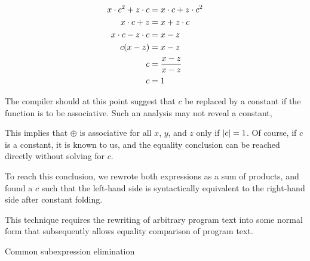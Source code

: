 \begin{align*}
x \cdot c^2 + z \cdot c &= x \cdot c + z \cdot c^2 \\
x \cdot c + z &= x + z \cdot c \\
x \cdot c - z \cdot c &= x - z \\
c (x-z) &= x-z \\
c &= {x-z\over x-z} \\
c &= 1
\end{align*}

The compiler should at this point suggest that $c$ be replaced by a constant if
the function is to be associative. Such an analysis may not reveal a constant, 

This implies that $\oplus$ is associative for all $x$, $y$, and $z$ only if
$\left|{c}\right|=1$. Of course, if $c$ is a constant, it is known to us, and the
equality conclusion can be reached directly without solving for $c$.

To reach this
conclusion, we rewrote both expressions as a sum of products, and found a $c$
such that the left-hand side is syntactically equivalent to the right-hand side
after constant folding.

This technique requires the rewriting of arbitrary program text into some
normal form that subsequently allows equality comparison of program text.

Common subexpression elimination
